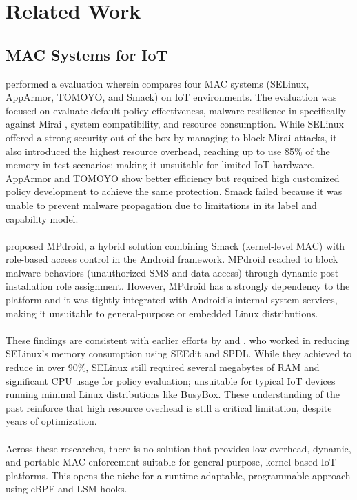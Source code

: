 
\section{Related Work}
\label{sec:rw}




\subsection{MAC Systems for IoT}



\cite{Evaluation_of_Effectiveness_of_MAC_Systems_Based_on_LSM_for_Protecting_IoT_Devices} performed a evaluation wherein compares four MAC systems (SELinux, AppArmor, TOMOYO, and Smack) on IoT environments. The evaluation was focused on evaluate default policy effectiveness, malware resilience in specifically against Mirai \citep{272224}, system compatibility, and resource consumption. While SELinux offered a strong security out-of-the-box by managing to block Mirai attacks, it also introduced the highest resource overhead, reaching up to use 85\% of the memory in test scenarios; making it unsuitable for limited IoT hardware. AppArmor and TOMOYO show better efficiency but required  high customized policy development to achieve the same protection. Smack failed because it was unable to prevent malware propagation due to limitations in its label and capability model.
\\\\
\cite{Enforcing_Multiple_Security_Policies_for_Android_System} proposed MPdroid, a hybrid solution combining Smack (kernel-level MAC) with role-based access control in the Android framework. MPdroid reached to block malware behaviors (unauthorized SMS and data access) through dynamic post-installation role assignment. However, MPdroid has a strongly dependency to the platform and it was tightly integrated with Android’s internal system services, making it unsuitable to general-purpose or embedded Linux distributions.
\\\\
These findings are consistent with earlier efforts by \cite{SELinux_for_consumer_electronics_devices} and \cite{Reducing_Resource_Consumption_of_SELinux_for_Embedded_Systems}, who worked in reducing SELinux’s memory consumption using SEEdit and SPDL. While they achieved  to reduce in over 90\%, SELinux still required several megabytes of RAM and significant CPU usage for policy evaluation; unsuitable for typical IoT devices running minimal Linux distributions like BusyBox. These understanding of the past reinforce that high resource overhead is still a critical limitation, despite years of optimization. 
\\\\
Across these researches, there is no solution that provides low-overhead, dynamic, and portable MAC enforcement suitable for general-purpose, kernel-based IoT platforms. This opens the niche for a runtime-adaptable, programmable approach using eBPF and LSM hooks.

